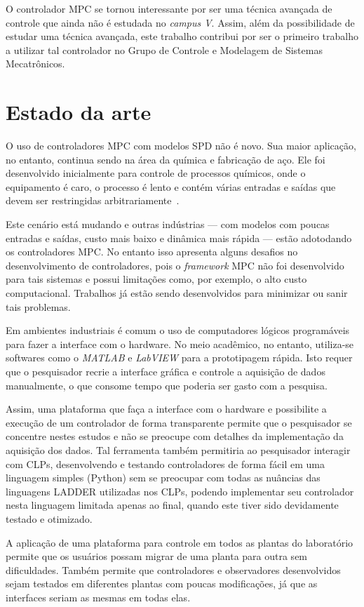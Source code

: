 O controlador \ac{MPC} se tornou interessante por ser uma técnica avançada de
controle que ainda não é estudada no \textit{campus V}. Assim, além da
possibilidade de estudar uma técnica avançada, este trabalho contribui por ser o
primeiro trabalho a utilizar tal controlador no Grupo de Controle e Modelagem de
Sistemas Mecatrônicos.

\section{Estado da arte}%
\label{sec:estado-da-arte}

O uso de controladores \ac{MPC} com modelos \ac{SPD} não é novo. Sua maior
aplicação, no entanto, continua sendo na área da química e fabricação de aço.
Ele foi desenvolvido inicialmente para controle de processos químicos, onde o
equipamento é caro, o processo é lento e contém várias entradas e saídas que
devem ser restringidas arbitrariamente~\cite{article:cairano}.

Este cenário está mudando e outras indústrias --- com modelos com poucas
entradas e saídas, custo mais baixo e dinâmica mais rápida --- estão adotodando
os controladores \ac{MPC}\@. No entanto isso apresenta alguns desafios no
desenvolvimento de controladores, pois o \textit{framework} \ac{MPC} não foi
desenvolvido para tais sistemas e possui limitações como, por exemplo, o alto
custo computacional. Trabalhos já estão sendo desenvolvidos para minimizar ou
sanir tais problemas.

Em ambientes industriais é comum o uso de computadores lógicos programáveis para
fazer a interface com o hardware. No meio acadêmico, no entanto, utiliza-se
softwares como o \textit{MATLAB} e \textit{LabVIEW} para a prototipagem rápida.
Isto requer que o pesquisador recrie a interface gráfica e controle a aquisição
de dados manualmente, o que consome tempo que poderia ser gasto com a pesquisa.

Assim, uma plataforma que faça a interface com o hardware e possibilite a
execução de um controlador de forma transparente permite que o pesquisador se
concentre nestes estudos e não se preocupe com detalhes da implementação da
aquisição dos dados. Tal ferramenta também permitiria ao pesquisador
interagir com CLPs, desenvolvendo e testando controladores de forma fácil em
uma linguagem simples (Python) sem se preocupar com todas as nuâncias das
linguagens LADDER utilizadas nos CLPs, podendo implementar seu controlador nesta
linguagem limitada apenas ao final, quando este tiver sido devidamente testado e
otimizado.

A aplicação de uma plataforma para controle em todos as plantas do laboratório
permite que os usuários possam migrar de uma planta para outra sem dificuldades.
Também permite que controladores e observadores desenvolvidos sejam testados em
diferentes plantas com poucas modificações, já que as interfaces seriam as
mesmas em todas elas.
